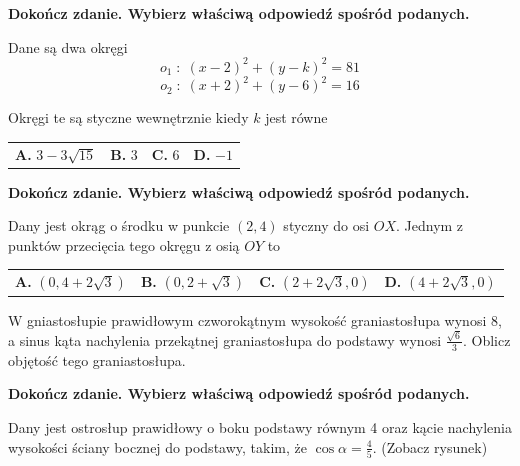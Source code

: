 \documentclass[12pt,a4paper]{article}
\theoremstyle{break}
\begin{document}

	\begin{zad}[0-1]
		\textbf{Dokończ zdanie. Wybierz właściwą odpowiedź spośród podanych.}
	\end{zad} 
	
	Dane są dwa okręgi
	$$o_1\;:\;(x-2)^2+(y-k)^2=81$$
	$$o_2\;:\;(x+2)^2+(y-6)^2=16$$
	
	Okręgi te są styczne wewnętrznie kiedy $k$ jest równe
	
	\vspace{0.5cm}
	\begin{tabular}{p{3.5cm} p{3.5cm} p{3.5cm} p{3.5cm}}
		\textbf{A. }$3-3\sqrt{15}$&
		\textbf{B. }$3$&
		\textbf{C. }$6$&
		\textbf{D. }$-1$\\
	\end{tabular}

	
	\begin{zad}[0-1]
		\textbf{Dokończ zdanie. Wybierz właściwą odpowiedź spośród podanych.}
	\end{zad} 
	
	Dany jest okrąg o środku w punkcie $(2,4)$ styczny do osi $OX$. Jednym z punktów przecięcia tego okręgu z osią $OY$ to
	
	\vspace{0.5cm}
	\begin{tabular}{p{3.5cm} p{3.5cm} p{3.5cm} p{3.5cm}}
		\textbf{A. }$(0,4+2\sqrt{3})$&
		\textbf{B. }$(0,2+\sqrt{3})$&
		\textbf{C. }$(2+2\sqrt{3},0)$&
		\textbf{D. }$(4+2\sqrt{3},0)$\\
	\end{tabular}
	
	\newpage
	
	\begin{zad}[0-3]
		W gniastosłupie prawidłowym czworokątnym wysokość graniastosłupa wynosi 8, a sinus kąta nachylenia przekątnej graniastosłupa do podstawy wynosi $\frac{\sqrt{6}}{3}$. Oblicz objętość tego graniastosłupa.
	\end{zad} 

	
	
	\begin{zad}[0-1]
		\textbf{Dokończ zdanie. Wybierz właściwą odpowiedź spośród podanych.}
	\end{zad} 

	Dany jest ostrosłup prawidłowy o boku podstawy równym 4 oraz kącie nachylenia wysokości ściany bocznej do podstawy, takim, że $\cos\alpha=\frac{4}{5}$. (Zobacz rysunek)
	
\end{document}
